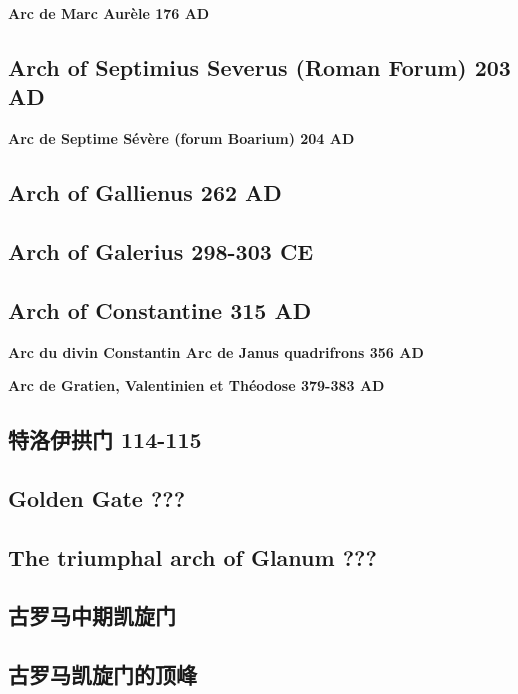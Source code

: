 \documentclass[a4paper,dvipdfm]{article}
\begin{document}
\textbf{Arc de Marc Aurèle 176 AD}

\subsection{Arch of Septimius Severus (Roman Forum) 203 AD}
\label{sec:arch-sept-sever}

\textbf{Arc de Septime Sévère (forum Boarium) 204 AD}

\subsection{Arch of Gallienus 262 AD}
\label{sec:arch-gallienus-262}

\subsection{Arch of Galerius 298-303 CE}
\label{sec:arch-galerius-298}

\subsection{Arch of Constantine 315 AD}

\textbf{Arc du divin Constantin Arc de Janus quadrifrons 356 AD}

\textbf{Arc de Gratien, Valentinien et Théodose 379-383 AD}


\subsection{特洛伊拱门 114-115}

\subsection{Golden Gate ???}
\label{sec:golden-gate-}

\subsection{The triumphal arch of Glanum ???}
\label{sec:triumph-arch-glan}



\subsection{古罗马中期凯旋门}

\subsection{古罗马凯旋门的顶峰}
\end{document}
